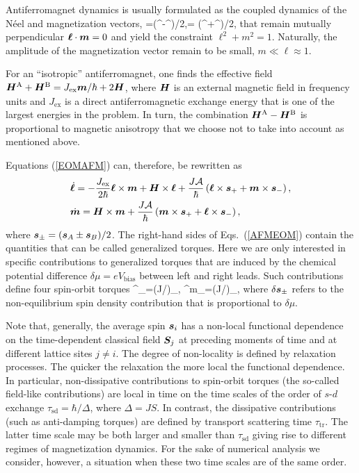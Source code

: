 Antiferromagnet dynamics is usually formulated as the coupled dynamics of the N\'eel and magnetization vectors,
\be
\bb{\ell}=\lt(^-^\rt)/2,\qquad {}= \lt(^+^\rt)/2,
\e
that remain mutually perpendicular $\boldsymbol{\ell}\cdot \boldsymbol{m}=0$ and yield the constraint $\ell^2+m^2=1$. Naturally, the amplitude of the magnetization vector remain to be small, $m\ll \ell \approx 1$.

For an ``isotropic'' antiferromagnet, one finds the effective field \cite{Gomonay2014} $\boldsymbol{H}^\text{A}+\boldsymbol{H}^\text{B}= J_\text{ex}\boldsymbol{m}/\hbar+2\boldsymbol{H}$, where $\boldsymbol{H}$ is an external magnetic field in frequency units and $J_\text{ex}$ is a direct antiferromagnetic exchange energy that is one of the largest energies in the problem. In turn, the combination $\boldsymbol{H}^\text{A}-\boldsymbol{H}^\text{B}$ is proportional to magnetic anisotropy that we choose not to take into account as mentioned above.  

Equations (\ref{EOMAFM}) can, therefore, be rewritten as
\begin{align}
&\dot{\boldsymbol{\ell}} = -\frac{J_\text{ex}}{2\hbar} \boldsymbol{\ell}\times\boldsymbol{m} +\boldsymbol{H}\times\boldsymbol{\ell}+\frac{J\mathcal{A}}{\hbar}\left(\boldsymbol{\ell}\times\boldsymbol{s}_++\boldsymbol{m}\times\boldsymbol{s}_-\right),\nonumber\\
&\dot{\boldsymbol{m}} = \boldsymbol{H}\times\boldsymbol{m}+\frac{J\mathcal{A}}{\hbar}\left(\boldsymbol{m}\times\boldsymbol{s}_++\boldsymbol{\ell}\times\boldsymbol{s}_-\right),
\label{AFMEOM}
\end{align}
where $\boldsymbol{s}_\pm=(\boldsymbol{s}_A\pm\boldsymbol{s}_B)/2$. The right-hand sides of Eqs.~(\ref{AFMEOM}) contain the quantities that can be called generalized torques. Here we are only interested in specific contributions to generalized torques that are induced by the chemical potential difference $\delta\mu=eV_\text{bias}$ between left and right leads. Such contributions define four spin-orbit torques  
\be
\label{SOT_def}
^\ell_\pm=(J/\hbar)\bb{\ell}\times\delta{}_\pm, \quad 
{}^m_\pm=(J/\hbar)\times\delta{}_\pm,
\e
where $\delta \boldsymbol{s}_\pm$ refers to the non-equilibrium spin density contribution that is proportional to $\delta\mu$. 

Note that, generally, the average spin $\boldsymbol{s}_i$ has a non-local functional dependence on the time-dependent classical field $\boldsymbol{S}_j$ at preceding moments of time  and at different lattice sites $j\neq i$. The degree of non-locality is defined by relaxation processes. The quicker the relaxation the more local the functional dependence. In particular, non-dissipative contributions to spin-orbit torques (the so-called field-like contributions) are local in time on the time scales of the order of $s$-$d$ exchange  $\tau_\text{sd}=\hbar/\Delta$, where $\Delta=J S$. In contrast, the dissipative contributions (such as anti-damping torques) are defined by transport scattering time $\tau_\text{tr}$. The latter time scale may be both larger and smaller than $\tau_\text{sd}$ giving rise to different regimes of magnetization dynamics. For the sake of numerical analysis we consider, however, a situation when these two time scales are of the same order.


